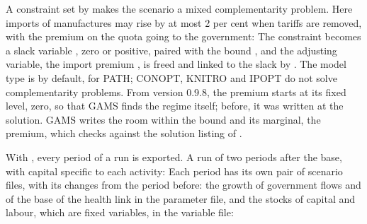 A constraint set by  makes the scenario a mixed
complementarity problem. Here imports of manufactures may rise by at most 2
per cent when tariffs are removed, with the premium on the quota going to the
government:
The constraint becomes a slack variable , zero or positive, paired
with the bound , and the adjusting variable, the import premium
, is freed and linked to the slack by . The model
type is  by default, for PATH; CONOPT, KNITRO and IPOPT do not solve
complementarity problems. From version 0.9.8, the premium starts at its fixed
level, zero, so that GAMS finds the regime itself; before, it was written at
the solution. GAMS writes the room within the bound and its marginal, the
premium, which  checks against the solution listing of
.


With , every period of a run is exported. A run of two periods
after the base, with capital specific to each activity:
Each period has its own pair of scenario files, with its changes from the
period before: the growth of government flows and of the base of the health
link in the parameter file, and the stocks of capital and labour, which are
fixed variables, in the variable file:


